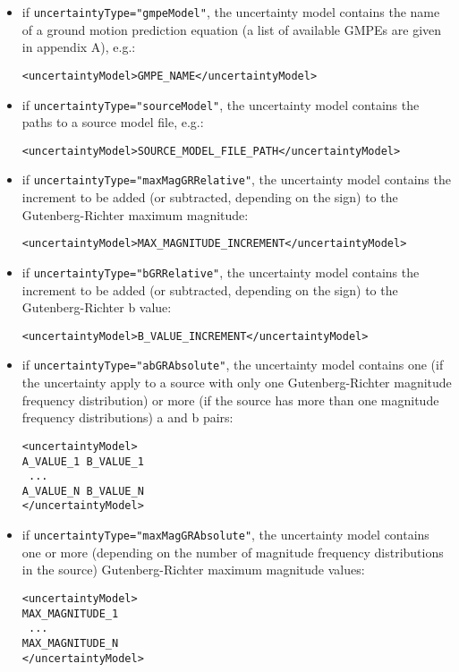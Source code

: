 \begin{itemize}
\item if \Verb+uncertaintyType="gmpeModel"+, the uncertainty model contains the name of a ground motion prediction equation (a list of available GMPEs are given in appendix A), e.g.:
\begin{Verbatim}[frame=single, commandchars=\\\{\}, samepage=true]
<uncertaintyModel>GMPE_NAME</uncertaintyModel>
\end{Verbatim}
\item if \Verb+uncertaintyType="sourceModel"+, the uncertainty model contains the paths to a source model file, e.g.:
\begin{Verbatim}[frame=single, commandchars=\\\{\}, samepage=true]
<uncertaintyModel>SOURCE_MODEL_FILE_PATH</uncertaintyModel>
\end{Verbatim}
\item if \Verb+uncertaintyType="maxMagGRRelative"+, the uncertainty model contains the increment to be added (or subtracted, depending on the sign) to the Gutenberg-Richter maximum magnitude:
\begin{Verbatim}[frame=single, commandchars=\\\{\}, samepage=true]
<uncertaintyModel>MAX_MAGNITUDE_INCREMENT</uncertaintyModel>
\end{Verbatim}
\item if \Verb+uncertaintyType="bGRRelative"+, the uncertainty model contains the increment to be added (or subtracted, depending on the sign) to the Gutenberg-Richter b value:
\begin{Verbatim}[frame=single, commandchars=\\\{\}, samepage=true]
<uncertaintyModel>B_VALUE_INCREMENT</uncertaintyModel>
\end{Verbatim}
\item if \Verb+uncertaintyType="abGRAbsolute"+, the uncertainty model contains one (if the uncertainty apply to a source with only one Gutenberg-Richter magnitude frequency distribution) or more (if the source has more than one magnitude frequency distributions) a and b pairs:
\begin{Verbatim}[frame=single, commandchars=\\\{\}, samepage=true]
<uncertaintyModel>
A_VALUE_1 B_VALUE_1
 ... 
A_VALUE_N B_VALUE_N
</uncertaintyModel>
\end{Verbatim}
\item if \Verb+uncertaintyType="maxMagGRAbsolute"+, the uncertainty model contains one or more (depending on the number of magnitude frequency distributions in the source) Gutenberg-Richter maximum magnitude values:
\begin{Verbatim}[frame=single, commandchars=\\\{\}, samepage=true]
<uncertaintyModel>
MAX_MAGNITUDE_1
 ... 
MAX_MAGNITUDE_N
</uncertaintyModel>
\end{Verbatim}
\end{itemize}
